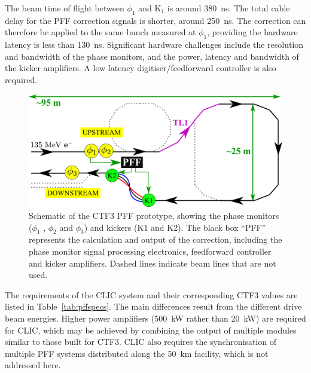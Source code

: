 \documentclass[%
 reprint,
 superscriptaddress,
 amsmath,
 amssymb,
 prl,
]{revtex4-1}
\begin{document}
The beam time of flight between \(\phi_1\) and \(\mathrm{K_1}\) is around 
380~ns. The total cable delay for the PFF correction signals 
is shorter, around 250~ns. The correction can therefore be applied to the same 
bunch measured at \(\phi_1\), providing the hardware latency is less than 
130~ns. Significant hardware challenges include the resolution and bandwidth of 
the phase monitors, and the power, latency and bandwidth of the kicker 
amplifiers. A low latency digitiser/feedforward controller is also required.
 
\begin{figure}
	\includegraphics[width=\columnwidth]{figs/ctfpffLayout}%
	\caption{\label{fig:pffLayout}Schematic of the CTF3 PFF prototype, 
	showing the phase monitors (\(\phi_1\) , 
	\(\phi_2\) and \(\phi_3\)) and kickers (K1 and K2). The black box “PFF” 
	represents the calculation and output of the correction, including the 
	phase monitor signal processing electronics, feedforward controller and 
	kicker amplifiers. Dashed lines indicate beam lines that are not used. 
		}
\end{figure}

The requirements of the CLIC system and their corresponding CTF3 values are 
listed in Table~\ref{tab:pffspecs}. The main differences result from the 
different drive beam energies. Higher power 
amplifiers (500~kW rather than 20~kW) are required for CLIC, which may be 
achieved by combining the output of multiple modules similar to those built for 
CTF3. CLIC also requires the synchronisation of multiple PFF systems 
distributed along the 50~km facility, which is not addressed here.
\end{document}
